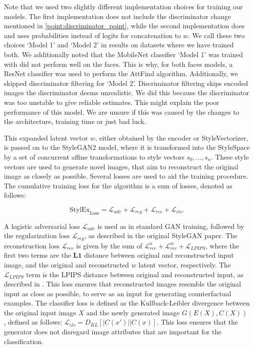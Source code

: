 Note that we used two slightly different implementation choices for training our models. The first implementation does not include the discriminator change mentioned in \ref{point:discriminator_point}, while the second implementation does and uses probabilities instead of logits for concatenation to $w$. We call these two choices `Model 1' and `Model 2' in results on datasets where we have trained both. We additionally noted that the MobileNet classifier `Model 1' was trained with did not perform well on the faces. This is why, for both faces models, a ResNet classifier was used to perform the AttFind algorithm. Additionally, we skipped discriminator filtering for `Model 2'. Discriminator filtering skips encoded images the discriminator deems unrealistic. We did this because the discriminator was too unstable to give reliable estimates. This might explain the poor performance of this model. We are unsure if this was caused by the changes to the architecture, training time or just bad luck.

This expanded latent vector $w$, either obtained by the encoder or StyleVectorizer, is passed on to the StyleGAN2 model, where it is transformed into the StyleSpace by a set of concurrent affine transformations to style vectors $s_{0}, ..., s_{n}$. These style vectors are used to generate novel images, that aim to reconstruct the original image as closely as possible. Several losses are used to aid the training procedure. The cumulative training loss for the algorithm is a sum of losses, denoted as follows:

\begin{equation}
\textrm{StylEx}_\textrm{Loss} = \mathcal{L}_{adv} + \mathcal{L}_{reg} + \mathcal{L}_{rec} + \mathcal{L}_{cls}.    
\end{equation}

A logistic adversarial loss \cite{goodfellow2014generative} $\mathcal{L}_{adv}$ is used as in standard GAN training, followed by the regularization loss $\mathcal{L}_{reg}$, as described in the original StyleGAN \cite{karras2020analyzing} paper. The reconstruction loss $\mathcal{L}_{rec}$ is given by the sum of  $\mathcal{L}_{rec}^x + \mathcal{L}_{rec}^w + \mathcal{L}_{LPIPS} $, where the first two terms are the $\mathbf{L1}$ distance between original and reconstructed input image, and the original and reconstructed $w$ latent vector, respectively. The $\mathcal{L}_{LPIPS}$ term is the LPIPS distance between original and reconstructed input, as described in \cite{8578166}. This loss ensures that reconstructed images resemble the original input as close as possible, to serve as an input for generating counterfactual examples. The classifier loss is defined as the Kullback-Leibler divergence between the original input image $X$ and the newly generated image $G(E(X), C(X))$ , defined as follows: $\mathcal{L}_{cls} = D_{KL}[|C(x')||C(x)]$. This loss ensures that the generator does not disregard image attributes that are important for the classification. 

